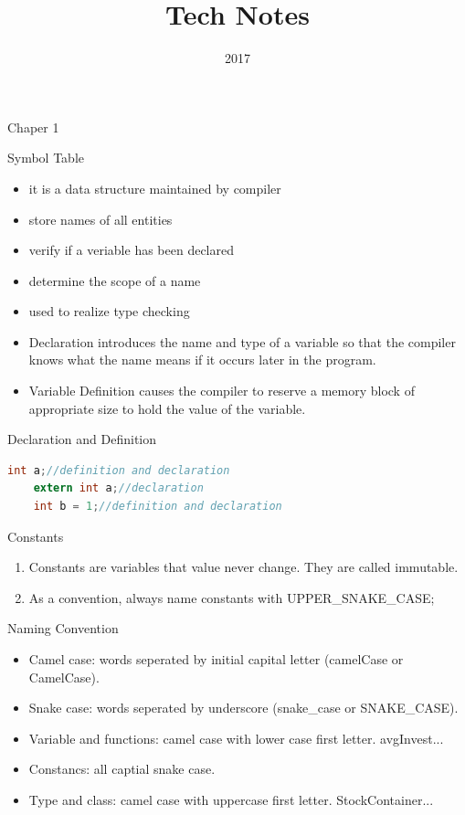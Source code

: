 \documentclass[a4paper]{tufte-handout}
\title{Tech Notes}
\date{2017}
\begin{document}
\maketitle

Chaper 1
\begin{projects}
  Symbol Table
  \begin{itemize}
  \item it is a data structure maintained by compiler
  \item store names of all entities
  \item verify if a veriable has been declared
  \item determine the scope of a name
  \item used to realize type checking
  \end{itemize}

  \begin{itemize}
  \item Declaration introduces the name and type of a variable so that the compiler knows what the name means if it occurs later in the program.
  \item Variable Definition causes the compiler to reserve a memory block of appropriate size to hold the value of the variable.
  \end{itemize}

  Declaration and Definition
  \begin{lstlisting}[language=C]
    int a;//definition and declaration
    extern int a;//declaration
    int b = 1;//definition and declaration
  \end{lstlisting}
\end{projects}

Constants
\begin{enumerate}
\item Constants are variables that value never change. They are called immutable.
\item As a convention, always name constants with UPPER\_SNAKE\_CASE;
\end{enumerate}

Naming Convention
\begin{itemize}
\item Camel case: words seperated by initial capital letter (camelCase or CamelCase).
\item Snake case: words seperated by underscore (snake\_case or SNAKE\_CASE).
\item Variable and functions: camel case with lower case first letter. avgInvest...
\item Constancs: all captial snake case.
\item Type and class: camel case with uppercase first letter. StockContainer...
\end{itemize}
\end{document}
